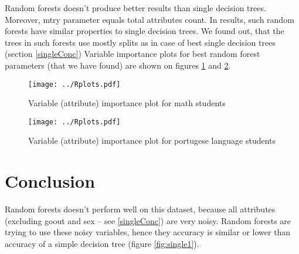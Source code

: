 \documentclass[a4paper]{article}
\begin{document}


Random forests doesn't produce better results than single decision trees.
Moreover, mtry parameter equals total attributes count.
In results, such random forests have similar properties to single decision trees.
We found out, that the trees in such forests use mostly splits as
in case of best single decision trees (section \ref{singleConc})
Variable importance plots for best random forest parameters (that we have found)
are shown on figures \ref{fig:imp1} and \ref{fig:imp2}.


\begin{figure}[]
    \caption[]{Variable (attribute) importance plot for math students}
    \centering
    \texttt{[image: ../Rplots.pdf]}
    \label{fig:imp1}
\end{figure}

\begin{figure}[]
    \caption[]{Variable (attribute) importance plot for portugese language students}
    \centering
    \texttt{[image: ../Rplots.pdf]}
    \label{fig:imp2}
\end{figure}

\section{Conclusion}

Random forests doesn't perform well on this dataset, because
all attributes (excluding goout and sex -- see \ref{singleConc}) are very noisy.
Random forests are trying to use these noisy variables,
hence they accuracy is similar or lower than accuracy of
a simple decision tree (figure \ref{fig:single1}).
\end{document}
